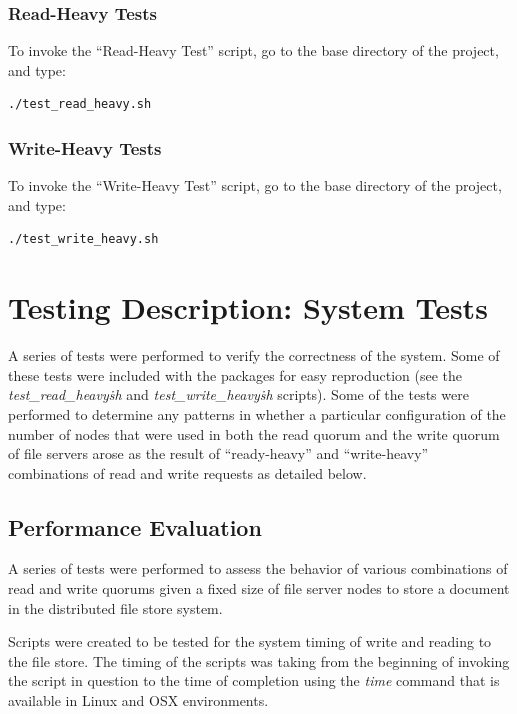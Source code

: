 \documentclass
[english,a4paper]{article}
\begin{document}
\subsubsection{Read-Heavy Tests}
To invoke the ``Read-Heavy Test'' script, go to the base directory of
the project, and type:

\begin{verbatim}
./test_read_heavy.sh
\end{verbatim}

\subsubsection{Write-Heavy Tests}
To invoke the ``Write-Heavy Test'' script, go to the base directory of
the project, and type:

\begin{verbatim}
./test_write_heavy.sh
\end{verbatim}

\newpage
\section{Testing Description: System Tests}

A series of tests were performed to verify the correctness of the
system. Some of these tests were included with the packages for easy
reproduction (see the \emph{test\_read\_heavy\.sh} and
\emph{test\_write\_heavy\.sh} scripts). Some of the tests were
performed to determine any patterns in whether a particular
configuration of the number of nodes that were used in both the read
quorum and the write quorum of file servers arose as the result of
``ready-heavy'' and ``write-heavy'' combinations of read and write
requests as detailed below.

\subsection{Performance Evaluation}

A series of tests were performed to assess the behavior of various
combinations of read and write quorums given a fixed size of file
server nodes to store a document in the distributed file store
system. 

Scripts were created to be tested for the system timing of
write and reading to the file store. The timing of the scripts was
taking from the beginning of invoking the script in question to the
time of completion using the \emph{time} command that is available in
Linux and OSX environments.
\end{document}
